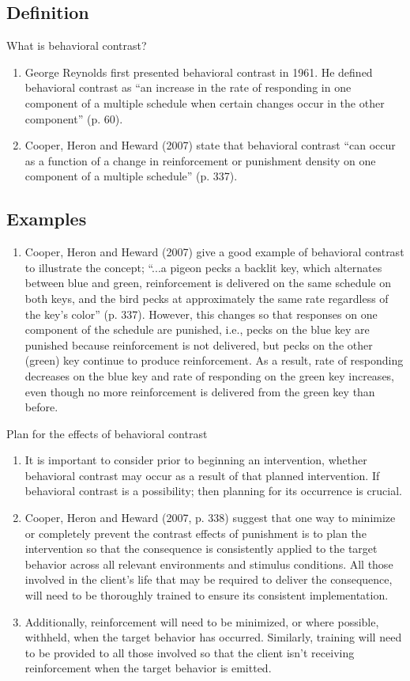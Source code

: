 \subsection{Definition}
What is behavioral contrast?
\begin{enumerate}
\item George Reynolds first presented behavioral contrast in 1961. He defined behavioral contrast as ``an increase in the rate of responding in one component of a multiple schedule when certain changes occur in the other component'' (p. 60). 
\item Cooper, Heron and Heward (2007) state that behavioral contrast ``can occur as a function of a change in reinforcement or punishment density on one component of a multiple schedule'' (p. 337).
\end{enumerate}
%
\subsection{Examples}
\begin{enumerate}
\item Cooper, Heron and Heward (2007) give a good example of behavioral contrast to illustrate the concept; ``...a pigeon pecks a backlit key, which alternates between blue and green, reinforcement is delivered on the same schedule on both keys, and the bird pecks at approximately the same rate regardless of the key's color'' (p. 337). However, this changes so that responses on one component of the schedule are punished, i.e., pecks on the blue key are punished because reinforcement is not delivered, but pecks on the other (green) key continue to produce reinforcement. As a result, rate of responding decreases on the blue key and rate of responding on the green key increases, even though no more reinforcement is delivered from the green key than before.
\end{enumerate}
%
Plan for the effects of behavioral contrast
\begin{enumerate}
\item It is important to consider prior to beginning an intervention, whether behavioral contrast may occur as a result of that planned intervention. If behavioral contrast is a possibility; then planning for its occurrence is crucial.
\item Cooper, Heron and Heward (2007, p. 338) suggest that one way to minimize or completely prevent the contrast effects of punishment is to plan the intervention so that the consequence is consistently applied to the target behavior across all relevant environments and stimulus conditions. All those involved in the client's life that may be required to deliver the consequence, will need to be thoroughly trained to ensure its consistent implementation.
\item Additionally, reinforcement will need to be minimized, or where possible, withheld, when the target behavior has occurred. Similarly, training will need to be provided to all those involved so that the client isn't receiving reinforcement when the target behavior is emitted.
\end{enumerate}
%
